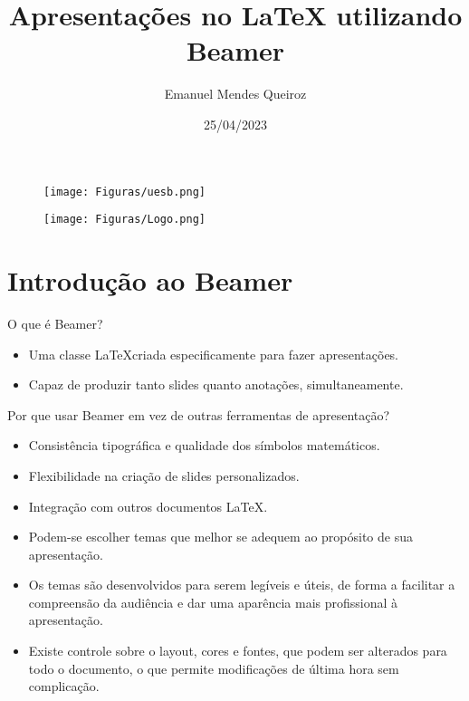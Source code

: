 \documentclass{beamer}
\author{Emanuel Mendes Queiroz}
\title{Apresenta\c c\~oes no LaTeX utilizando Beamer}
\institute{UESB}
\date{25/04/2023}
\begin{document}
\begin{frame}
    \titlepage
    \vspace{-0.5cm}
    \begin{figure}
        \hspace{-3.1cm}\texttt{[image: Figuras/uesb.png]}
    \end{figure}
    \begin{figure}
    \vspace{-2.8cm}
    \hspace{4.20cm}\texttt{[image: Figuras/Logo.png]}
    \end{figure}
\end{frame}

\begin{frame}
    \tableofcontents[sectionstyle=show,subsectionstyle=show/shaded/hide,subsubsectionstyle=show/shaded/hide]
\end{frame}

\section{Introdu\c c\~ao ao Beamer}

\begin{frame} \justifying
\begin{block}{O que é Beamer?} \justifying
    \begin{itemize}
        \item <1-> Uma classe \LaTeX criada especificamente para fazer apresenta\c c\~oes.
        \item <2-> Capaz de produzir tanto slides quanto anota\c c\~oes, simultaneamente.
    \end{itemize}
\end{block}
\end{frame}

\begin{frame}
    \begin{block}{Por que usar Beamer em vez de outras ferramentas de apresentação?}
    \begin{itemize}
        \item <1-> Consistência tipográfica e qualidade dos símbolos matemáticos.
        \item <2-> Flexibilidade na criação de slides personalizados.
        \item <3-> Integração com outros documentos LaTeX.
        \item <4-> Podem-se escolher temas que melhor se adequem ao propósito de sua apresentação.
        \item <5-> Os temas são desenvolvidos para serem legíveis e úteis, de forma a facilitar a compreensão da audiência e dar uma aparência mais profissional à apresentação. 
        \item <6-> Existe controle sobre o layout, cores e fontes, que podem ser alterados para todo o documento, o que permite modificações de última hora sem complicação.
    \end{itemize}
\end{block}
\end{frame}
\end{document}
